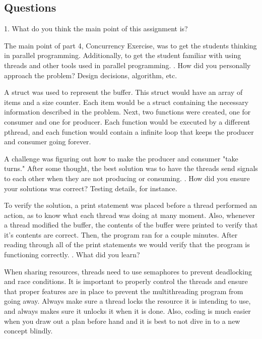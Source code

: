 \documentclass[onecolumn, draftclsnofoot,10pt, compsoc]{article}
\begin{document}
    \subsection{Questions}
        1. What do you think the main point of this assignment is? \newline \par
            \noindent The main point of part 4, Concurrency Exercise, was to get the students thinking in parallel programming. Additionally, to get the student familiar with using threads and other tools used in parallel programming.  \newline {}. How did you personally approach the problem? Design decisions, algorithm, etc. \newline \par
            \noindent A struct was used to represent the buffer. This struct would have an array of items and a size counter. Each item would be a struct containing the necessary information described in the problem. Next, two functions were created, one for consumer and one for producer. Each function would be executed by a different pthread, and each function would contain a infinite loop that keeps the producer and consumer going forever. \newline 
            
            \noindent A challenge was figuring out how to make the producer and consumer "take turns." After some thought, the best solution was to have the threads send signals to each other when they are not producing or consuming. \newline {}. How did you ensure your solutions was correct? Testing details, for instance. \newline \par
            \noindent To verify the solution, a print statement was placed before a thread performed an action, as to know what each thread was doing at many moment. Also, whenever a thread modified the buffer, the contents of the buffer were printed to verify that it's contents are correct. Then, the program ran for a couple minutes. After reading through all of the print statements we would verify that the program is functioning correctly. \newline {}. What did you learn? \newline \par
            \noindent When sharing resources, threads need to use semaphores to prevent deadlocking and race conditions. It is important to properly control the threads and ensure that proper features are in place to prevent the multithreading program from going away. Always make sure a thread locks the resource it is intending to use, and always makes sure it unlocks it when it is done. Also, coding is much easier when you draw out a plan before hand and it is best to not dive in to a new concept blindly.
\end{document}
